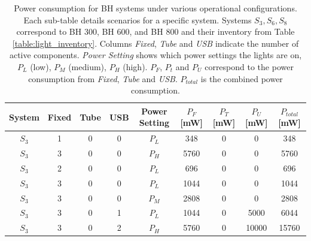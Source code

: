 \begin{table}[h!]
\centering
\small %
\caption{Power consumption for BH systems under various operational configurations. Each sub-table details scenarios for a specific system. Systems $S_3, S_6, S_8$ correspond to BH 300, BH 600, and BH 800 and their inventory from Table \ref{table:light_inventory}. Columns \textit{Fixed}, \textit{Tube} and \textit{USB} indicate the number of active components. \textit{Power Setting} shows which power settings the lights are on, $P_L$ (low), $P_M$ (medium), $P_H$ (high). $P_F$, $P_t$ and $P_U$ correspond to the power consumption from \textit{Fixed}, \textit{Tube} and \textit{USB}. $P_{total}$ is the combined power consumption.}
\label{table:power_configurations_all_systems}
\begin{subtable}{\textwidth}
    \centering
    \begin{tabularx}{\linewidth}{|C|S[table-format=1.0]|S[table-format=1.0]|S[table-format=1.0]|C|S[table-format=4.0]|S[table-format=4.0]|S[table-format=5.0]|c|}
    \hline
    \textbf{System} & \textbf{Fixed} & \textbf{Tube} & \textbf{USB} & \textbf{Power Setting} & \textbf{$P_F$ [mW]} & \textbf{$P_T$ [mW]} & \textbf{$P_U$ [mW]} & \textbf{$P_{total}$ [mW]} \\ \hline
    $S_3$  & 1   & 0   & 0   & $P_L$         & 348        & 0          & 0          & 348             \\ \hline
    $S_3$  & 3   & 0   & 0   & $P_H$         & 5760       & 0          & 0          & 5760            \\ \hline
    $S_3$  & 2   & 0   & 0   & $P_L$         & 696        & 0          & 0          & 696             \\ \hline
    $S_3$  & 3   & 0   & 0   & $P_L$         & 1044       & 0          & 0          & 1044            \\ \hline
    $S_3$  & 3   & 0   & 0   & $P_M$         & 2808       & 0          & 0          & 2808            \\ \hline
    $S_3$  & 3   & 0   & 1   & $P_L$         & 1044       & 0          & 5000       & 6044            \\ \hline
    $S_3$  & 3   & 0   & 2   & $P_H$         & 5760       & 0          & 10000      & 15760           \\ \hline

\end{tabularx}
\end{subtable}
\end{table}
